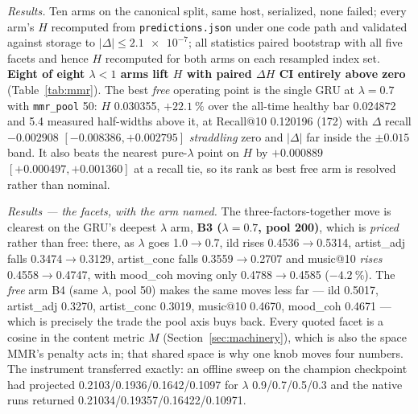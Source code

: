 \documentclass[11pt]{article}
\begin{document}
\emph{Results.} Ten arms on the canonical split, same host, serialized, none
failed; every arm's $H$ recomputed from \texttt{predictions.json} under one code
path and validated against storage to $|\Delta|\le\num{2.1e-7}$; all statistics
paired bootstrap with all five facets and hence $H$ recomputed for both arms on
each resampled index set. \textbf{Eight of eight $\lambda<1$ arms lift $H$ with
paired $\Delta H$ CI entirely above zero} (Table~\ref{tab:mmr}). The best
\emph{free} operating point is the single GRU at $\lambda=\num{0.7}$ with
\texttt{mmr\_pool} \num{50}: $H$ \num{0.030355}, $+\SI{22.1}{\percent}$ over the
all-time healthy bar \num{0.024872} and \num{5.4} measured half-widths above it,
at Recall@10 \num{0.120196} (\num{172}) with $\Delta$ recall $-\num{0.002908}$
$[-\num{0.008386},+\num{0.002795}]$ \emph{straddling} zero and $|\Delta|$ far
inside the $\pm\num{0.015}$ band. It also beats the nearest pure-$\lambda$ point
on $H$ by $+\num{0.000889}$ $[+\num{0.000497},+\num{0.001360}]$ at a recall tie,
so its rank as best free arm is resolved rather than nominal.

\emph{Results --- the facets, with the arm named.} The three-factors-together
move is clearest on the GRU's deepest $\lambda$ arm, \textbf{B3
($\lambda=\num{0.7}$, pool \num{200})}, which is \emph{priced} rather than free:
there, as $\lambda$ goes \num{1.0}$\to$\num{0.7}, ild rises
\num{0.4536}$\to$\num{0.5314}, artist\_adj falls
\num{0.3474}$\to$\num{0.3129}, artist\_conc falls
\num{0.3559}$\to$\num{0.2707} and music@10 \emph{rises}
\num{0.4558}$\to$\num{0.4747}, with mood\_coh moving only
\num{0.4788}$\to$\num{0.4585} ($-\SI{4.2}{\percent}$). The \emph{free} arm B4
(same $\lambda$, pool \num{50}) makes the same moves less far --- ild
\num{0.5017}, artist\_adj \num{0.3270}, artist\_conc \num{0.3019}, music@10
\num{0.4670}, mood\_coh \num{0.4671} --- which is precisely the trade the pool
axis buys back. Every quoted facet is a cosine in the content metric $M$
(Section~\ref{sec:machinery}), which is also the space MMR's penalty acts in;
that shared space is why one knob moves four numbers. The instrument transferred
exactly: an offline sweep on the champion checkpoint had projected
\num{0.2103}/\num{0.1936}/\num{0.1642}/\num{0.1097} for $\lambda$
\num{0.9}/\num{0.7}/\num{0.5}/\num{0.3} and the native runs returned
\num{0.21034}/\num{0.19357}/\num{0.16422}/\num{0.10971}.
\end{document}

